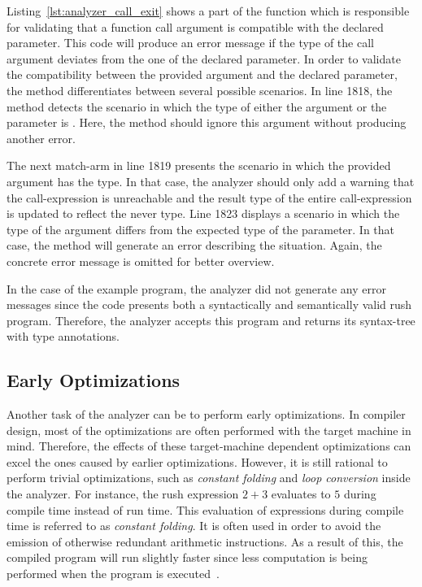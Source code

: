 
Listing~\ref{lst:analyzer_call_exit} shows a part of the  function which is responsible for validating that a function call argument is compatible with the declared parameter.
This code will produce an error message if the type of the call argument deviates from the one of the declared parameter.
In order to validate the compatibility between the provided argument and the declared parameter, the method differentiates between several possible scenarios.
In line 1818, the method detects the scenario in which the type of either the argument or the parameter is .
Here, the method should ignore this argument without producing another error.

The next match-arm in line 1819 presents the scenario in which the provided argument has the  type.
In that case, the analyzer should only add a warning that the call-expression is unreachable
and the result type of the entire call-expression is updated to reflect the never type.
Line 1823 displays a scenario in which the type of the argument differs from the expected type of the parameter.
In that case, the method will generate an error describing the situation.
Again, the concrete error message is omitted for better overview.

In the case of the example program, the analyzer did not generate any error messages since the code presents both a syntactically and semantically valid rush program.
Therefore, the analyzer accepts this program and returns its syntax-tree with type annotations.

\subsection{Early Optimizations}

Another task of the analyzer can be to perform early optimizations.
In compiler design, most of the optimizations are often performed with the target machine in mind.
Therefore, the effects of these target-machine dependent optimizations can excel the ones caused by earlier optimizations.
However, it is still rational to perform trivial optimizations, such as \emph{constant folding} and \emph{loop conversion} inside the analyzer.
For instance, the rush expression $2 + 3$ evaluates to $5$ during compile time instead of run time.
This evaluation of expressions during compile time is referred to as \emph{constant folding}.
It is often used in order to avoid the emission of otherwise redundant arithmetic instructions.
As a result of this, the compiled program will run slightly faster since less computation is being performed when the program is executed~\cite[p.~54]{wirth_compiler_construction_2005}.

